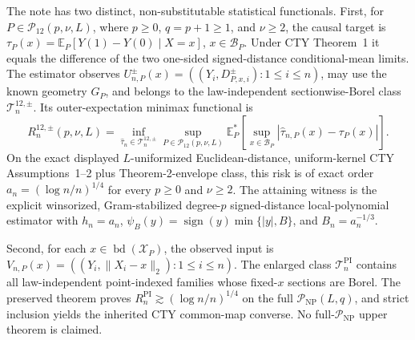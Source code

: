 The note has two distinct, non-substitutable statistical functionals.  First, for \(P\in\mathcal P_{12}(p,\nu,L)\), where \(p\geq0\), \(q=p+1\geq1\), and \(\nu\geq2\), the causal target is \(\tau_P(x)=\mathbb E_P[Y(1)-Y(0)\mid X=x]\), \(x\in\mathcal B_P\).  Under CTY Theorem~1 it equals the difference of the two one-sided signed-distance conditional-mean limits.  The estimator observes \(U^{\pm}_{n,P}(x)=((Y_i,D^{\pm}_{P,x,i}):1\leq i\leq n)\), may use the known geometry \(G_P\), and belongs to the law-independent sectionwise-Borel class \(\mathcal T_n^{12,\pm}\).  Its outer-expectation minimax functional is
\[
 R_n^{12,\pm}(p,\nu,L)=\inf_{\widehat\tau_n\in\mathcal T_n^{12,\pm}}
 \sup_{P\in\mathcal P_{12}(p,\nu,L)}
 \mathbb E_P^*\!\left[\sup_{x\in\mathcal B_P}|\widehat\tau_{n,P}(x)-\tau_P(x)|\right].
\]
On the exact displayed \(L\)-uniformized Euclidean-distance, uniform-kernel CTY Assumptions~1--2 plus Theorem-2-envelope class, this risk is of exact order \(a_n=(\log n/n)^{1/4}\) for every \(p\geq0\) and \(\nu\geq2\).  The attaining witness is the explicit winsorized, Gram-stabilized degree-\(p\) signed-distance local-polynomial estimator with \(h_n=a_n\), \(\psi_B(y)=\operatorname{sign}(y)\min\{|y|,B\}\), and \(B_n=a_n^{-1/3}\).

Second, for each \(x\in\operatorname{bd}(\mathcal X_P)\), the observed input is \(V_{n,P}(x)=((Y_i,\lVert X_i-x\rVert_2):1\leq i\leq n)\).  The enlarged class \(\mathcal T_n^{\mathrm{PI}}\) contains all law-independent point-indexed families whose fixed-\(x\) sections are Borel.  The preserved theorem proves \(R_n^{\mathrm{PI}}\gtrsim(\log n/n)^{1/4}\) on the full \(\mathcal P_{\mathrm{NP}}(L,q)\), and strict inclusion yields the inherited CTY common-map converse.  No full-\(\mathcal P_{\mathrm{NP}}\) upper theorem is claimed.